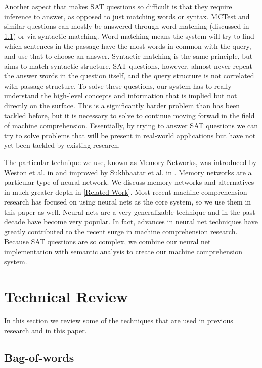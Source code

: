 \documentclass[pageno]{jpaper}
\begin{document}
Another aspect that makes SAT questions so difficult is that they require
inference to answer, as opposed to just matching words or syntax. MCTest and
similar questions can mostly be answered through word-matching (discussed in
\ref{Bag-of-words}) or via syntactic matching. Word-matching means the system
will try to find which sentences in the passage have the most words in common
with the query, and use that to choose an answer. Syntactic matching is the same
principle, but aims to match syntactic structure. SAT questions, however, almost
never repeat the answer words in the question itself, and the query structure is
not correlated with passage structure. To solve these questions, our system has
to really understand the high-level concepts and information that is implied but
not directly on the surface. This is a significantly harder problem than has
been tackled before, but it is necessary to solve to continue moving forwad in
the field of machine comprehension. Essentially, by trying to answer SAT
questions we can try to solve problems that will be present in real-world
applications but have not yet been tackled by existing research.

The particular technique we use, known as Memory Networks, was introduced
by Weston et al. in \cite{Weston2015a} and improved by Sukhbaatar et al. in
\cite{Sukhbaatar2015}. Memory networks are a particular type of neural
network. We discuss memory networks and alternatives in much greater depth in
\ref{Related Work}. Most recent machine comprehension research has focused on
using neural nets as the core system, so we use them in this paper as well.
Neural nets are a very generalizable technique and in the past decade have
become very popular. In fact, advances in neural net techniques have greatly
contributed to the recent surge in machine comprehension research. Because SAT
questions are so complex, we combine our neural net implementation with
semantic analysis to create our machine comprehension system.

\section{Technical Review}
\label{Technical Review}

In this section we review some of the techniques that are used in previous
research and in this paper.

\subsection{Bag-of-words}
\label{Bag-of-words}
\end{document}
